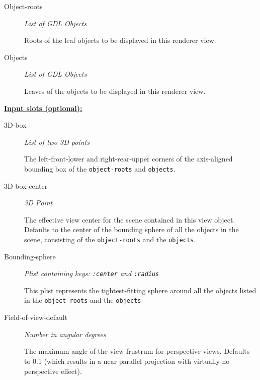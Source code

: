 \documentclass [11pt]{book}
\begin{document}
\begin{itemize}
\begin{description}
\item [Object-roots]
\emph{List of GDL Objects}

 Roots of the leaf objects to be displayed in this renderer view.




\item [Objects]
\emph{List of GDL Objects}

 Leaves of the objects to be displayed in this renderer view.




\end{description}






\textbf{
\underline{Input slots (optional):}}

\begin{description}

\item [3D-box]
\emph{List of two 3D points}

 The left-front-lower and right-rear-upper corners of the axis-aligned bounding
box of the \texttt{object-roots} and \texttt{objects}.




\item [3D-box-center]
\emph{3D Point}

 The effective view center for the scene contained in this view object. Defaults to the center of the bounding sphere of all
the objects in the scene, consisting of the \texttt{object-roots} and the \texttt{objects}.




\item [Bounding-sphere]
\emph{Plist containing keys: \texttt{:center} and \texttt{:radius}}

 This plist represents the tightest-fitting sphere
around all the objects listed in the \texttt{object-roots} and the \texttt{objects}




\item [Field-of-view-default]
\emph{Number in angular degrees}

 The maximum angle of the view frustrum for perspective views.
Defaults to 0.1 (which results in a near parallel projection with virtually no perspective effect).





\end{description}
\end{itemize}
\end{document}
